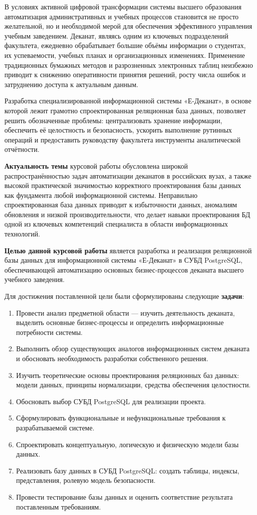 \documentclass[14pt, a4paper]{extreport}
\begin{document}
В условиях активной цифровой трансформации системы высшего образования автоматизация административных и учебных процессов становится не просто желательной, но и необходимой мерой для обеспечения эффективного управления учебным заведением. Деканат, являясь одним из ключевых подразделений факультета, ежедневно обрабатывает большие объёмы информации о студентах, их успеваемости, учебных планах и организационных изменениях. Применение традиционных бумажных методов и разрозненных электронных таблиц неизбежно приводит к снижению оперативности принятия решений, росту числа ошибок и затруднению доступа к актуальным данным.

Разработка специализированной информационной системы «Е-Деканат», в основе которой лежит грамотно спроектированная реляционная база данных, позволяет решить обозначенные проблемы: централизовать хранение информации, обеспечить её целостность и безопасность, ускорить выполнение рутинных операций и предоставить руководству факультета инструменты аналитической отчётности.

\textbf{Актуальность темы} курсовой работы обусловлена широкой распространённостью задач автоматизации деканатов в российских вузах, а также высокой практической значимостью корректного проектирования базы данных как фундамента любой информационной системы. Неправильно спроектированная база данных приводит к избыточности данных, аномалиям обновления и низкой производительности, что делает навыки проектирования БД одной из ключевых компетенций специалиста в области информационных технологий.

\textbf{Целью данной курсовой работы} является разработка и реализация реляционной базы данных для информационной системы «Е-Деканат» в СУБД PostgreSQL, обеспечивающей автоматизацию основных бизнес-процессов деканата высшего учебного заведения.

Для достижения поставленной цели были сформулированы следующие \textbf{задачи}:
\begin{enumerate}
    \item Провести анализ предметной области --- изучить деятельность деканата, выделить основные бизнес-процессы и определить информационные потребности системы.
    \item Выполнить обзор существующих аналогов информационных систем деканата и обосновать необходимость разработки собственного решения.
    \item Изучить теоретические основы проектирования реляционных баз данных: модели данных, принципы нормализации, средства обеспечения целостности.
    \item Обосновать выбор СУБД PostgreSQL для реализации проекта.
    \item Сформулировать функциональные и нефункциональные требования к разрабатываемой системе.
    \item Спроектировать концептуальную, логическую и физическую модели базы данных.
    \item Реализовать базу данных в СУБД PostgreSQL: создать таблицы, индексы, представления, ролевую модель безопасности.
    \item Провести тестирование базы данных и оценить соответствие результата поставленным требованиям.
\end{enumerate}
\end{document}
